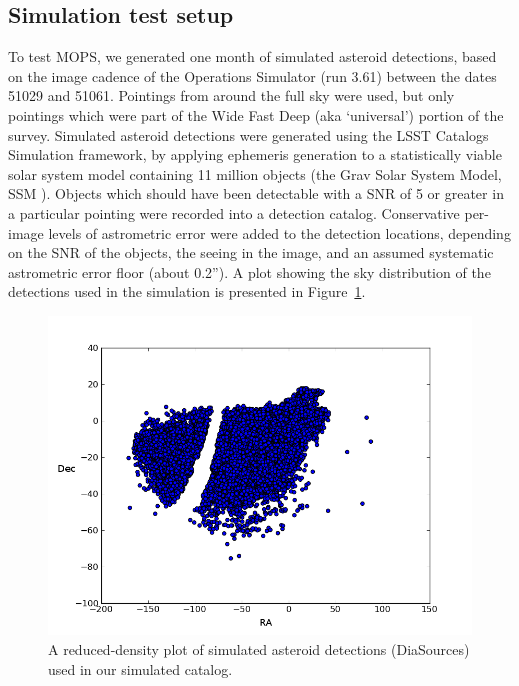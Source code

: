 \subsection{Simulation test setup}

To test MOPS, we generated one month of simulated asteroid detections,
based on the image cadence of the Operations Simulator (run 3.61)
between the dates 51029 and 51061.  Pointings from
around the full sky were used, but only pointings which were part of
the Wide Fast Deep (aka `universal') portion of the survey.  Simulated asteroid detections were
generated using the LSST Catalogs Simulation framework, by applying ephemeris generation to a statistically viable
solar system model containing 11 million objects (the Grav Solar
System Model, SSM \citep{Grav2011}). 
Objects which should have been detectable with a SNR of 5 or greater in a particular pointing were
recorded into a detection catalog.  Conservative per-image levels of
astrometric error were added to the detection locations, depending on
the SNR of the objects, the seeing in the image, and an assumed
systematic astrometric error floor (about 0.2'').  A plot showing the sky
distribution of the detections used in the simulation is presented
in Figure~\ref{diasPlot}.  
 

\begin{figure}[ht!]
\centering
\includegraphics[scale=.7]{newIllustrations/fullSkyYear5_sourcesScatter.png}
\caption[Test diaSource distribution.]{A reduced-density plot of simulated asteroid detections
  (DiaSources) used in our simulated catalog.}
\label{diasPlot}
\end{figure}




